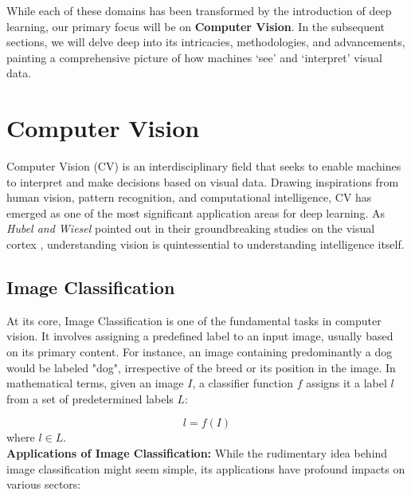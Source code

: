While each of these domains has been transformed by the introduction of deep learning, our primary focus will be on \textbf{Computer Vision}. In the subsequent sections, we will delve deep into its intricacies, methodologies, and advancements, painting a comprehensive picture of how machines `see' and `interpret' visual data.
\section{Computer Vision}

Computer Vision (CV) is an interdisciplinary field that seeks to enable machines to interpret and make decisions based on visual data. Drawing inspirations from human vision, pattern recognition, and computational intelligence, CV has emerged as one of the most significant application areas for deep learning. As \textit{Hubel and Wiesel} pointed out in their groundbreaking studies on the visual cortex \cite{hubel1962receptive}, understanding vision is quintessential to understanding intelligence itself.

\subsection{Image Classification}

At its core, Image Classification is one of the fundamental tasks in computer vision. It involves assigning a predefined label to an input image, usually based on its primary content. For instance, an image containing predominantly a dog would be labeled "dog", irrespective of the breed or its position in the image. In mathematical terms, given an image \(I\), a classifier function \(f\) assigns it a label \(l\) from a set of predetermined labels \(L\):

\[ l = f(I) \]
where \( l \in L \).\\

\textbf{Applications of Image Classification:}
While the rudimentary idea behind image classification might seem simple, its applications have profound impacts on various sectors:


